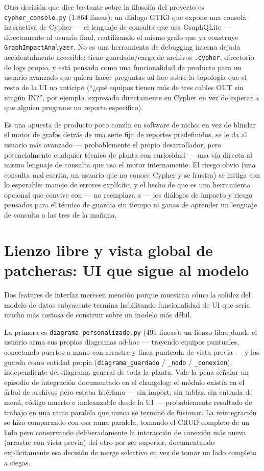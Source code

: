 \documentclass[11pt,twocolumn]{article}
\begin{document}
Otra decisión que dice bastante sobre la filosofía del proyecto es \texttt{cypher\_console.py} (1.864 líneas): un diálogo GTK3 que expone una consola interactiva de Cypher --- el lenguaje de consulta que usa GraphQLite --- directamente al usuario final, reutilizando el mismo grafo que ya construye \texttt{GraphImpactAnalyzer}. No es una herramienta de debugging interna dejada accidentalmente accesible: tiene guardado/carga de archivos \texttt{.cypher}, directorio de logs propio, y está pensada como una funcionalidad de producto para un usuario avanzado que quiera hacer preguntas ad-hoc sobre la topología que el resto de la UI no anticipó (``¿qué equipos tienen más de tres cables OUT sin ningún IN?'', por ejemplo, expresado directamente en Cypher en vez de esperar a que alguien programe un reporte específico).

Es una apuesta de producto poco común en software de nicho: en vez de blindar el motor de grafos detrás de una serie fija de reportes predefinidos, se le da al usuario más avanzado --- probablemente el propio desarrollador, pero potencialmente cualquier técnico de planta con curiosidad --- una vía directa al mismo lenguaje de consulta que usa el motor internamente. El riesgo obvio (una consulta mal escrita, un usuario que no conoce Cypher y se frustra) se mitiga con lo esperable: manejo de errores explícito, y el hecho de que es una herramienta opcional que convive con --- no reemplaza a --- los diálogos de impacto y riesgo pensados para el técnico de guardia sin tiempo ni ganas de aprender un lenguaje de consulta a las tres de la mañana.

\section{Lienzo libre y vista global de patcheras: UI que sigue al modelo}

Dos features de interfaz merecen mención porque muestran cómo la solidez del modelo de datos subyacente termina habilitando funcionalidad de UI que sería mucho más costosa de construir sobre un modelo más débil.

La primera es \texttt{diagrama\_personalizado.py} (491 líneas): un lienzo libre donde el usuario arma sus propios diagramas ad-hoc --- trayendo equipos puntuales, conectando puertos a mano con arrastre y línea punteada de vista previa --- y los guarda como entidad propia (\texttt{diagrama\_guardado} / \texttt{\_nodo} / \texttt{\_conexion}), independiente del diagrama general de toda la planta. Vale la pena señalar un episodio de integración documentado en el changelog: el módulo existía en el árbol de archivos pero estaba huérfano --- sin import, sin tablas, sin entrada de menú, código muerto e inalcanzable desde la UI --- probablemente resultado de trabajo en una rama paralela que nunca se terminó de fusionar. La reintegración se hizo comparando con esa rama paralela, tomando el CRUD completo de un lado pero conservando deliberadamente la interacción de conexión más nueva (arrastre con vista previa) del otro por ser superior, documentando explícitamente esa decisión de merge selectivo en vez de tomar un lado completo a ciegas.
\end{document}
